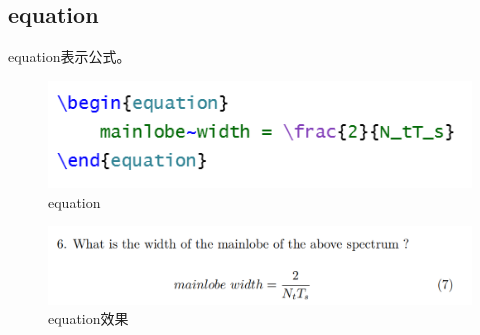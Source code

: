 \documentclass{article}
\begin{document}
\subsection{equation}
equation表示公式。
\begin{figure}[H]
    \centering
    \includegraphics[width=1\linewidth]{equation1.png}
    \caption{equation}
\end{figure}
\begin{figure}[H]
    \centering
    \includegraphics[width=1\linewidth]{equation2.png}
    \caption{equation效果}
\end{figure}
\end{document}

